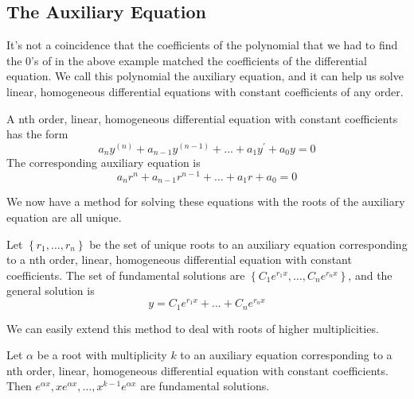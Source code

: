 \subsection{The Auxiliary Equation}
\noindent
It's not a coincidence that the coefficients of the polynomial that we had to find the 0's of in the above example matched the coefficients of the differential equation. We call this polynomial the auxiliary equation, and it can help us solve linear, homogeneous differential equations with constant coefficients of any order.
\begin{definition}
	A nth order, linear, homogeneous differential equation with constant coefficients has the form
	\begin{equation*}
		a_ny^{(n)} + a_{n-1}y^{(n-1)} + \ldots + a_1y^\prime + a_0y = 0
	\end{equation*}
	The corresponding auxiliary equation is
	\begin{equation*}
		a_nr^n + a_{n-1}r^{n-1} + \ldots + a_1r + a_0 = 0
	\end{equation*}
\end{definition}

\noindent
We now have a method for solving these equations with the roots of the auxiliary equation are all unique. 
\begin{theorem}
	Let $\left\{r_1, \ldots, r_n\right\}$ be the set of unique roots to an auxiliary equation corresponding to a nth order, linear, homogeneous differential equation with constant coefficients. The set of fundamental solutions are $\left\{C_1e^{r_1x}, \ldots, C_ne^{r_nx}\right\}$, and the general solution is
	\begin{equation*}
		y = C_1e^{r_1x} + \ldots + C_ne^{r_nx}
	\end{equation*}
\end{theorem}

\noindent
We can easily extend this method to deal with roots of higher multiplicities.
\begin{theorem}
	Let $\alpha$ be a root with multiplicity $k$ to an auxiliary equation corresponding to a nth order, linear, homogeneous differential equation with constant coefficients. Then $e^{\alpha x}, xe^{\alpha x}, \ldots, x^{k-1}e^{\alpha x}$ are fundamental solutions.
\end{theorem}

